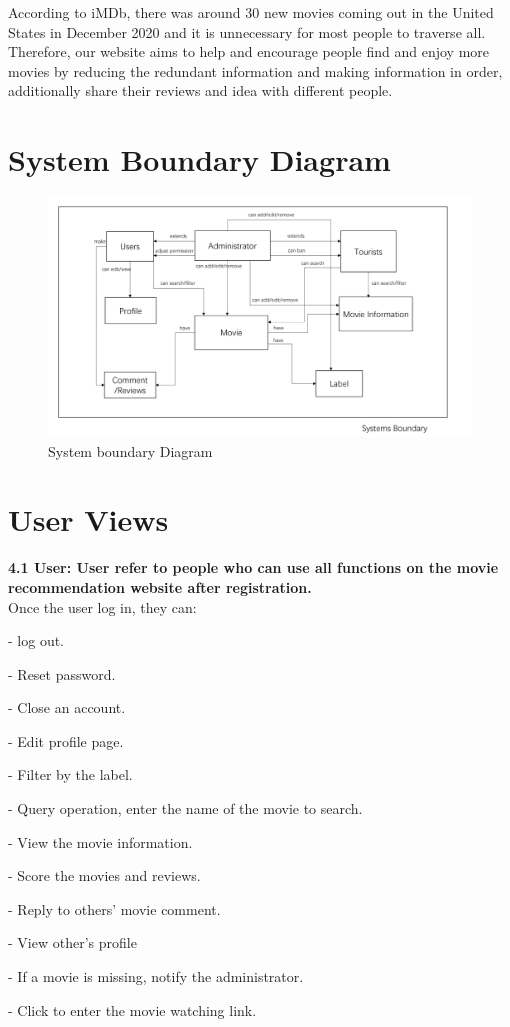\documentclass[10pt]{article}
\begin{document}
According to iMDb, there was around 30 new movies coming out in the United States in December 2020 and it is unnecessary for most people to traverse all. Therefore, our website aims to help and encourage people find and enjoy more movies by reducing the redundant information and making information in order, additionally share their reviews and idea with different people.

\section{System Boundary Diagram}
\begin{figure}[H]
\centering
\includegraphics[scale =0.4]{sbd.png}
\caption{System boundary Diagram}
\label{fig:image}
\end{figure}

\section{User Views}
\noindent \textbf{4.1 User: User refer to people who can use all functions on the movie recommendation website after registration.\\}
\noindent 
Once the user log in, they can: 
\begin{itemize}
\begin{multicols}{2}
\item[-] log out.
\item[-] Reset password.
\item[-] Close an account.
\item[-] Edit profile page.
\item[-] Filter by the label.
\item[-] Query operation, enter the name of the movie to search.
\item[-] View the movie information.
\item[-] Score the movies and reviews.
\item[-] Reply to others' movie comment.
\item[-] View other’s profile 
\item[-] If a movie is missing, notify the administrator.
\item[-] Click to enter the movie watching link.   
\end{multicols}
\end{itemize}
\end{document}
